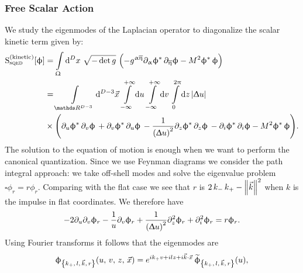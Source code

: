 \subsubsection{Free Scalar Action} 
 
We study the eigenmodes of the Laplacian operator to diagonalize the scalar kinetic term given by:\footnotemark{}
\begin{equation}
  \begin{split}
    \rS_{\text{s}\qed}^{(\text{kinetic})}\qty[ \phi ]
    & =
    \int\limits_{\Omega} \dd[D]{x}\,
    \sqrt{- \det g}~
    \qty(%
      - g^{\alpha\beta} \ipd{\alpha} \phi^*\, \ipd{\beta} \phi
      - M^2  \phi^*\, \phi
    )
    \\
    & =
    \int\limits_{\R^{D-3}} \dd[D-3]{\vec{x}}\,
    \infinfint{u}\,
    \infinfint{v}\,
    \finiteint{z}{0}{2\pi}
    \abs{\Delta u}
    \\
    & \times
    \qty(%
      \ipd{u} \phi^*\, \ipd{v} \phi\,
      +
      \ipd{v} \phi^*\, \ipd{u} \phi\,
      -
      \frac{1}{\qty(\Delta u)^2} \ipd{z} \phi^*\, \ipd{z} \phi\,
      -
      \ipd{i} \phi^*\, \ipd{i} \phi
      -
      M^2 \phi^*\, \phi
    ).
  \end{split}
\end{equation}
The solution to the equation of motion is enough when we want to perform the canonical quantization.
Since we use Feynman diagrams we consider the path integral approach: we take off-shell modes and solve the eigenvalue problem $\square \phi_r = r \phi_r$.
Comparing with the flat case we see that $r$ is $2\, k_-\, k_+ - \norm{\vec{k}}^2$ when $k$ is the impulse in flat coordinates.
We therefore have
\begin{equation}
  -2 \partial_{u} \partial_{v} \upphi_r
  -
  \frac{1}{u} \partial_{v} \upphi_r
  +
  \frac{1}{\qty(\Updelta u)^2} \partial_{z}^2 \upphi_r
  +
  \partial_{i}^2 \upphi_r
  =
  r \upphi_r.
  \label{eq:nbo_eom}
\end{equation}
Using Fourier transforms it follows that the eigenmodes are
\begin{equation}
  \upphi_{\qty{k_+,\, l,\, \vec{k},\, r}}\qty(u,\, v,\, z,\, \vec{x})
  =
  e^{i k_+ v + i l z + i \vec{k} \cdot \vec{x}}\,
  \widetilde{\upphi}_{\qty{k_+,\, l,\, \vec{k},\, r}}(u),
\end{equation}
